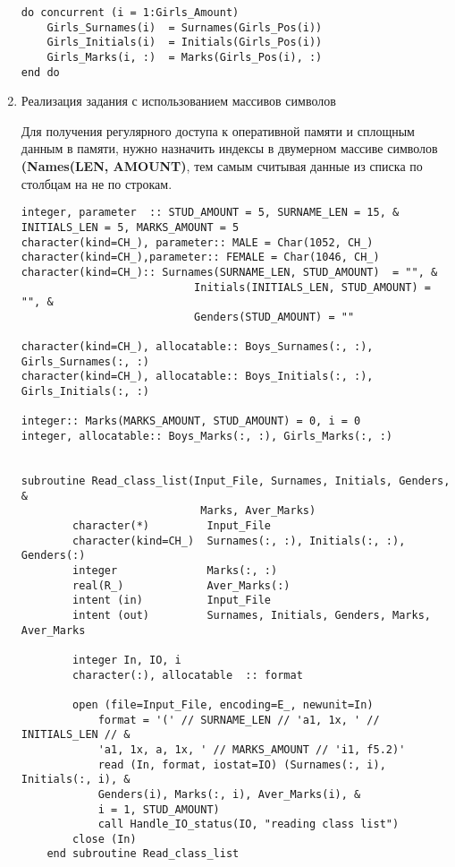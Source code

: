 \documentclass[a4paper,12pt]{extreport}
\begin{document}
\begin{enumerate}
\begin{verbatim}
do concurrent (i = 1:Girls_Amount)
    Girls_Surnames(i)  = Surnames(Girls_Pos(i))
    Girls_Initials(i)  = Initials(Girls_Pos(i))
    Girls_Marks(i, :)  = Marks(Girls_Pos(i), :)
end do
\end{verbatim}

\item Реализация задания с использованием массивов символов
    
Для получения регулярного доступа к оперативной памяти и сплощным данным в памяти, нужно назначить индексы в двумерном массиве символов \textbf{(Names(LEN, AMOUNT)}, тем самым считывая данные из списка по столбцам на не по строкам.
\begin{verbatim}
integer, parameter  :: STUD_AMOUNT = 5, SURNAME_LEN = 15, &
INITIALS_LEN = 5, MARKS_AMOUNT = 5
character(kind=CH_), parameter:: MALE = Char(1052, CH_)
character(kind=CH_),parameter:: FEMALE = Char(1046, CH_)
character(kind=CH_):: Surnames(SURNAME_LEN, STUD_AMOUNT)  = "", &
                           Initials(INITIALS_LEN, STUD_AMOUNT) = "", &                    
                           Genders(STUD_AMOUNT) = ""

character(kind=CH_), allocatable:: Boys_Surnames(:, :), Girls_Surnames(:, :)
character(kind=CH_), allocatable:: Boys_Initials(:, :), Girls_Initials(:, :)

integer:: Marks(MARKS_AMOUNT, STUD_AMOUNT) = 0, i = 0
integer, allocatable:: Boys_Marks(:, :), Girls_Marks(:, :)


subroutine Read_class_list(Input_File, Surnames, Initials, Genders, &
                            Marks, Aver_Marks)
        character(*)         Input_File
        character(kind=CH_)  Surnames(:, :), Initials(:, :), Genders(:)
        integer              Marks(:, :)
        real(R_)             Aver_Marks(:)
        intent (in)          Input_File
        intent (out)         Surnames, Initials, Genders, Marks, Aver_Marks

        integer In, IO, i
        character(:), allocatable  :: format
      
        open (file=Input_File, encoding=E_, newunit=In)
            format = '(' // SURNAME_LEN // 'a1, 1x, ' // INITIALS_LEN // &
            'a1, 1x, a, 1x, ' // MARKS_AMOUNT // 'i1, f5.2)'
            read (In, format, iostat=IO) (Surnames(:, i), Initials(:, i), &
            Genders(i), Marks(:, i), Aver_Marks(i), &
            i = 1, STUD_AMOUNT)
            call Handle_IO_status(IO, "reading class list")
        close (In)
    end subroutine Read_class_list



\end{verbatim}
\end{enumerate}
\end{document}

